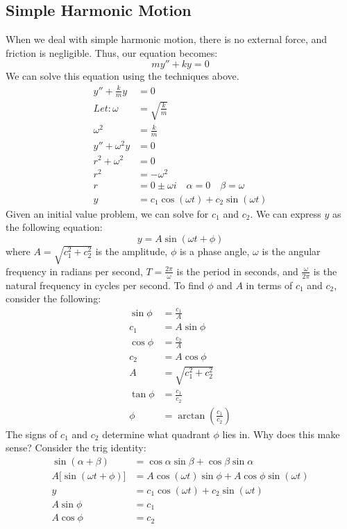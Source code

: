 \documentclass{math}
\begin{document}
\subsection*{Simple Harmonic Motion}
When we deal with simple harmonic motion, there is no external force, and
friction is negligible. Thus, our equation becomes:
\[ my''+ky = 0 \]
We can solve this equation using the techniques above.
\begin{align*}
  y''+\frac{k}{m}y &= 0 \\
  Let: \omega &= \sqrt{\frac{k}{m}} \\
  \omega^2 &= \frac{k}{m} \\
  y''+\omega^2y &= 0 \\
  r^2+\omega^2 &= 0 \\
  r^2 &= -\omega^2 \\
  r &= 0\pm\omega i \quad \alpha = 0 \quad \beta = \omega \\
  y &= c_1\cos(\omega t)+c_2\sin(\omega t)
\end{align*}
Given an initial value problem, we can solve for \( c_1 \) and \( c_2 \). We can
express \( y \) as the following equation:
\[ y = A\sin(\omega t+\phi) \]
where \( A = \sqrt{c_1^2+c_2^2} \) is the amplitude, \( \phi \) is a phase
angle, \( \omega \) is the angular frequency in radians per second, \( T =
\frac{2\pi}{\omega} \) is the period in seconds, and \( \frac{\omega}{2\pi} \)
is the natural frequency in cycles per second. To find \( \phi \) and \( A \)
in terms of \( c_1 \) and \( c_2 \), consider the following:
\begin{align*}
  \sin\phi &= \frac{c_1}{A} \\
  c_1 &= A\sin\phi \\
  \cos\phi &= \frac{c_2}{A} \\
  c_2 &= A\cos\phi \\
  A &= \sqrt{c_1^2+c_2^2} \\
  \tan\phi &= \frac{c_1}{c_2} \\
  \phi &= \arctan(\frac{c_1}{c_2})
\end{align*}
The signs of \( c_1 \) and \( c_2 \) determine what quadrant \( \phi \) lies in.
Why does this make sense? Consider the trig identity:
\begin{align*}
  \sin(\alpha+\beta) &= \cos\alpha\sin\beta+\cos\beta\sin\alpha \\
  A\bigg[\sin(\omega t+\phi)\bigg] &=
    A\cos(\omega t)\sin\phi+A\cos\phi\sin(\omega t) \\
  y &= c_1\cos(\omega t)+c_2\sin(\omega t) \\
  A\sin\phi &= c_1 \\
  A\cos\phi &= c_2
\end{align*}
\end{document}
